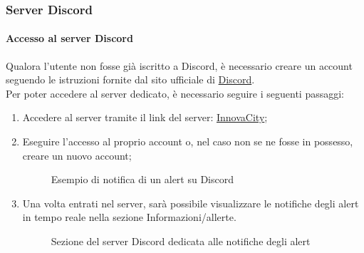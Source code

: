 \subsubsection{Server Discord}

\paragraph{Accesso al server Discord}
Qualora l'utente non fosse già iscritto a Discord, è necessario creare un account seguendo le istruzioni fornite dal sito ufficiale di \href{https://discord.com/}{Discord}.\\
Per poter accedere al server dedicato, è necessario seguire i seguenti passaggi:
\begin{enumerate}
    \item Accedere al server tramite il link del server: \href{https://discord.gg/9VZ8me7x}{InnovaCity};
    \item Eseguire l'accesso al proprio account o, nel caso non se ne fosse in possesso, creare un nuovo account;
    \begin{figure}[H]
        \centering
        \caption{Esempio di notifica di un alert su Discord}
        \label{fig:my_label}
    \end{figure}
    \item Una volta entrati nel server, sarà possibile visualizzare le notifiche degli alert in tempo reale nella sezione Informazioni/allerte.
    \begin{figure}[H]
        \centering
        \caption{Sezione del server Discord dedicata alle notifiche degli alert}    
        \label{fig:my_label}
    \end{figure}
\end{enumerate}

